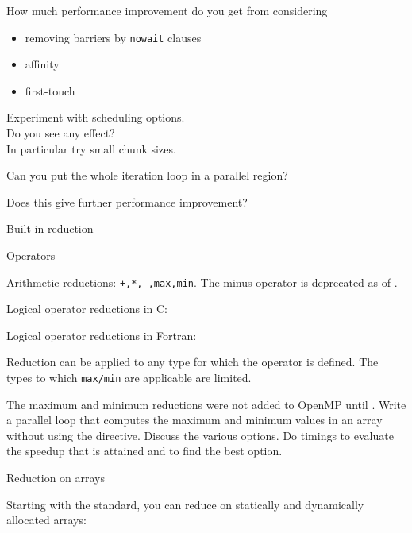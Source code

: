 \begin{exercise}
  \label{ex:omp-jacobi2}
  How much performance improvement do you get from considering
  \begin{itemize}
  \item removing barriers by \lstinline[language=omp]{nowait} clauses
  \item affinity
  \item first-touch
  \end{itemize}
\end{exercise}

\begin{exercise}
  \label{ex:omp-jacobi3}
  Experiment with scheduling options.\\
  Do you see any effect?\\
  In particular try small chunk sizes.
\end{exercise}

\begin{exercise}
  \label{ex:omp-jacobi4}
  Can you put the whole iteration loop in a parallel region?

  Does this give further performance improvement?
\end{exercise}

 {Built-in reduction}

 {Operators}

Arithmetic reductions: \lstinline{+,*,-,max,min}.
The minus operator is deprecated as of .

Logical operator reductions in C: \n{& && | || ^}

Logical operator reductions in Fortran:

Reduction can be applied to any type for which the operator is defined.
The types to which \lstinline{max/min} are applicable are limited.

\begin{exercise}
  The maximum and minimum reductions were not added to OpenMP until
  .
  Write a parallel loop that computes the maximum and
  minimum values in an array without using the  directive.
  Discuss the various options. Do timings
  to evaluate the speedup that is attained and to find the best option.
\end{exercise}

 {Reduction on arrays}
\label{sec:omp-array-reduct}

Starting with the  standard, you can reduce
on statically and dynamically allocated arrays:

